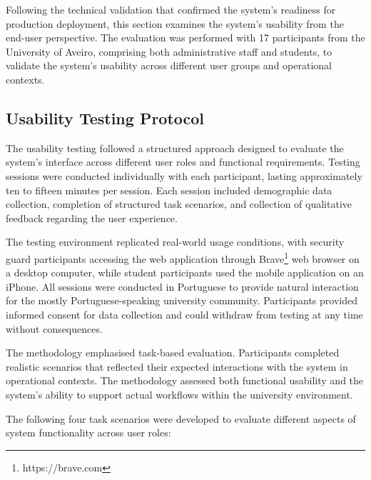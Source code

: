 Following the technical validation that confirmed the system's readiness for production deployment, this section examines the system's usability from the end-user perspective. The evaluation was performed with 17 participants from the University of Aveiro, comprising both administrative staff and students, to validate the system's usability across different user groups and operational contexts.

\subsection{Usability Testing Protocol} \label{subsection:usability_protocol}

The usability testing followed a structured approach designed to evaluate the system's interface across different user roles and functional requirements. Testing sessions were conducted individually with each participant, lasting approximately ten to fifteen minutes per session. Each session included demographic data collection, completion of structured task scenarios, and collection of qualitative feedback regarding the user experience.

The testing environment replicated real-world usage conditions, with security guard participants accessing the web application through Brave\footnote{https://brave.com} web browser on a desktop computer, while student participants used the mobile application on an iPhone. All sessions were conducted in Portuguese to provide natural interaction for the mostly Portuguese-speaking university community. Participants provided informed consent for data collection and could withdraw from testing at any time without consequences.

The methodology emphasised task-based evaluation. Participants completed realistic scenarios that reflected their expected interactions with the system in operational contexts. The methodology assessed both functional usability and the system's ability to support actual workflows within the university environment.

The following four task scenarios were developed to evaluate different aspects of system functionality across user roles:


